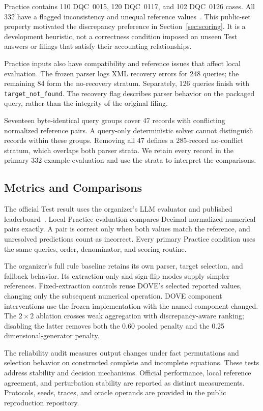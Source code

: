 \documentclass[conference]{IEEEtran}
\begin{document}
Practice contains 110 DQC~0015, 120 DQC~0117, and 102 DQC~0126 cases. All 332 have a flagged inconsistency and unequal reference values~\cite{task3data}. This public-set property motivated the discrepancy preference in Section~\ref{sec:scoring}. It is a development heuristic, not a correctness condition imposed on unseen Test answers or filings that satisfy their accounting relationships.


Practice inputs also have compatibility and reference issues that affect local evaluation. The frozen parser logs XML recovery errors for 248 queries; the remaining 84 form the no-recovery stratum. Separately, 126 queries finish with \texttt{target\_not\_found}. The recovery flag describes parser behavior on the packaged query, rather than the integrity of the original filing.

Seventeen byte-identical query groups cover 47 records with conflicting normalized reference pairs. A query-only deterministic solver cannot distinguish records within these groups. Removing all 47 defines a 285-record no-conflict stratum, which overlaps both parser strata. We retain every record in the primary 332-example evaluation and use the strata to interpret the comparisons.

\subsection{Metrics and Comparisons}
The official Test result uses the organizer's LLM evaluator and published leaderboard~\cite{task3results}. Local Practice evaluation compares Decimal-normalized numerical pairs exactly. A pair is correct only when both values match the reference, and unresolved predictions count as incorrect. Every primary Practice condition uses the same queries, order, denominator, and scoring routine.

The organizer's full rule baseline retains its own parser, target selection, and fallback behavior. Its extraction-only and sign-flip modes supply simpler references. Fixed-extraction controls reuse DOVE's selected reported values, changing only the subsequent numerical operation. DOVE component interventions use the frozen implementation with the named component changed. The $2\times2$ ablation crosses weak aggregation with discrepancy-aware ranking; disabling the latter removes both the 0.60 pooled penalty and the 0.25 dimensional-generator penalty.

The reliability audit measures output changes under fact permutations and selection behavior on constructed complete and incomplete equations. These tests address stability and decision mechanisms. Official performance, local reference agreement, and perturbation stability are reported as distinct measurements. Protocols, seeds, traces, and oracle operands are provided in the public reproduction repository.
\end{document}
